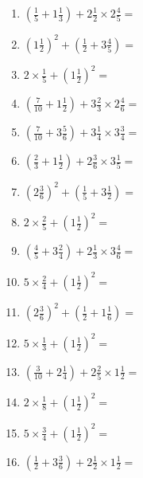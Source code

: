 \documentclass[12pt]{article}
\begin{document}
\begin{enumerate}
\item \large $ (\frac{1}{5} + 1 \frac{1}{3}) + 2 \frac{1}{2} \times 2 \frac{4}{5} = $ \vspace{1.8cm}
\item \large $ (1 \frac{1}{2})^2 + (\frac{1}{2} + 3 \frac{4}{5}) = $ \vspace{1.8cm}
\item \large $ 2 \times \frac{1}{5} + (1 \frac{1}{2})^2 = $ \vspace{1.8cm}
\item \large $ (\frac{7}{10} + 1 \frac{1}{2}) + 3 \frac{2}{3} \times 2 \frac{4}{6} = $ \vspace{1.8cm}
\newpage
\item \large $ (\frac{7}{10} + 3 \frac{5}{6}) + 3 \frac{1}{4} \times 3 \frac{3}{4} = $ \vspace{1.8cm}
\item \large $ (\frac{2}{3} + 1 \frac{1}{2}) + 2 \frac{3}{6} \times 3 \frac{1}{5} = $ \vspace{1.8cm}
\item \large $ (2 \frac{3}{6})^2 + (\frac{1}{5} + 3 \frac{1}{2}) = $ \vspace{1.8cm}
\item \large $ 2 \times \frac{2}{5} + (1 \frac{1}{2})^2 = $ \vspace{1.8cm}
\item \large $ (\frac{4}{5} + 3 \frac{2}{4}) + 2 \frac{1}{3} \times 3 \frac{4}{6} = $ \vspace{1.8cm}
\item \large $ 5 \times \frac{2}{4} + (1 \frac{1}{2})^2 = $ \vspace{1.8cm}
\item \large $ (2 \frac{3}{6})^2 + (\frac{1}{2} + 1 \frac{1}{6}) = $ \vspace{1.8cm}
\item \large $ 5 \times \frac{1}{3} + (1 \frac{1}{2})^2 = $ \vspace{1.8cm}
\item \large $ (\frac{3}{10} + 2 \frac{1}{4}) + 2 \frac{2}{5} \times 1 \frac{1}{2} = $ \vspace{1.8cm}
\item \large $ 2 \times \frac{1}{8} + (1 \frac{1}{2})^2 = $ \vspace{1.8cm}
\newpage
\item \large $ 5 \times \frac{3}{4} + (1 \frac{1}{2})^2 = $ \vspace{1.8cm}
\item \large $ (\frac{1}{2} + 3 \frac{3}{6}) + 2 \frac{1}{2} \times 1 \frac{1}{2} = $ \vspace{1.8cm}

\end{enumerate}
\end{document}
